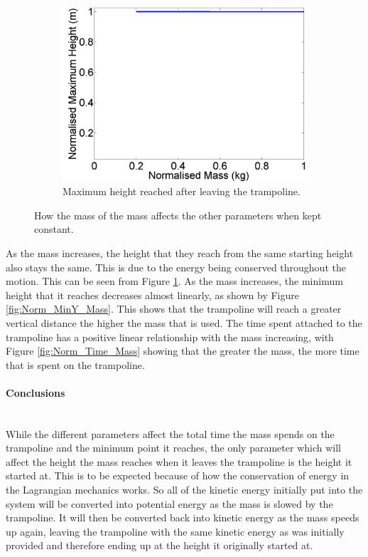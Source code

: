\begin{figure}[H]
    \begin{subfigure}[t]{0.3\textwidth}
		\includegraphics[width=\textwidth]{Norm_Height_Mass.png}
    	\caption{Maximum height reached after leaving the trampoline.}\label{fig:Norm_Height_Mass}
    \end{subfigure}\hfill
    \caption{How the mass of the mass affects the other parameters when kept constant.}\label{fig:Norm_Mass}
\end{figure}
\noindent As the mass increases, the height that they reach from the same starting height also stays the same. This is due to the energy being conserved throughout the motion. This can be seen from Figure \ref{fig:Norm_Height_Mass}.
As the mass increases, the minimum height that it reaches decreases almost linearly, as shown by Figure \ref{fig:Norm_MinY_Mass}. This shows that the trampoline will reach a greater vertical distance the higher the mass that is used.
The time spent attached to the trampoline has a positive linear relationship with the mass increasing, with Figure \ref{fig:Norm_Time_Mass} showing that the greater the mass, the more time that is spent on the trampoline.

\paragraph{Conclusions}\mbox{}\\
\noindent While the different parameters affect the total time the mass spends on the trampoline and the minimum point it reaches, the only parameter which will affect the height the mass reaches when it leaves the trampoline is the height it started at. This is to be expected because of how the conservation of energy in the Lagrangian mechanics works. So all of the kinetic energy initially put into the system will be converted into potential energy as the mass is slowed by the trampoline. It will then be converted back into kinetic energy as the mass speeds up again, leaving the trampoline with the same kinetic energy as was initially provided and therefore ending up at the height it originally started at.


